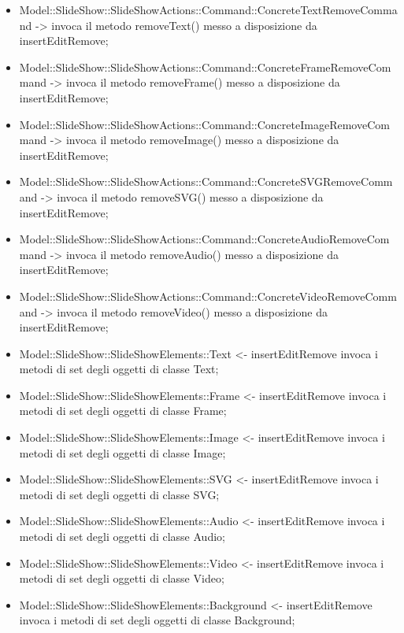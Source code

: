 {\begin{itemize}
		\item Model::\-SlideShow::\-SlideShowActions::\-Command::\-ConcreteTextRemoveCommand -> invoca il metodo removeText() messo a disposizione da insertEditRemove;
		\item Model::\-SlideShow::\-SlideShowActions::\-Command::\-ConcreteFrameRemoveCommand -> invoca il metodo removeFrame() messo a disposizione da insertEditRemove;
		\item Model::\-SlideShow::\-SlideShowActions::\-Command::\-ConcreteImageRemoveCommand -> invoca il metodo removeImage() messo a disposizione da insertEditRemove;
		\item Model::\-SlideShow::\-SlideShowActions::\-Command::\-ConcreteSVGRemoveCommand -> invoca il metodo removeSVG() messo a disposizione da insertEditRemove;
		\item Model::\-SlideShow::\-SlideShowActions::\-Command::\-ConcreteAudioRemoveCommand -> invoca il metodo removeAudio() messo a disposizione da insertEditRemove;
		\item Model::\-SlideShow::\-SlideShowActions::\-Command::\-ConcreteVideoRemoveCommand -> invoca il metodo removeVideo() messo a disposizione da insertEditRemove;
			
			\item Model::\-SlideShow::\-SlideShowElements::\-Text <- insertEditRemove invoca i metodi di set degli oggetti di classe Text;
			\item Model::\-SlideShow::\-SlideShowElements::\-Frame <- insertEditRemove invoca i metodi di set degli oggetti di classe Frame;
			\item Model::\-SlideShow::\-SlideShowElements::\-Image <- insertEditRemove invoca i metodi di set degli oggetti di classe Image;
			\item Model::\-SlideShow::\-SlideShowElements::\-SVG <- insertEditRemove invoca i metodi di set degli oggetti di classe SVG;
			\item Model::\-SlideShow::\-SlideShowElements::\-Audio <- insertEditRemove invoca i metodi di set degli oggetti di classe Audio;
			\item Model::\-SlideShow::\-SlideShowElements::\-Video <- insertEditRemove invoca i metodi di set degli oggetti di classe Video;
			\item Model::\-SlideShow::\-SlideShowElements::\-Background <- insertEditRemove invoca i metodi di set degli oggetti di classe Background;



\end{itemize}}
